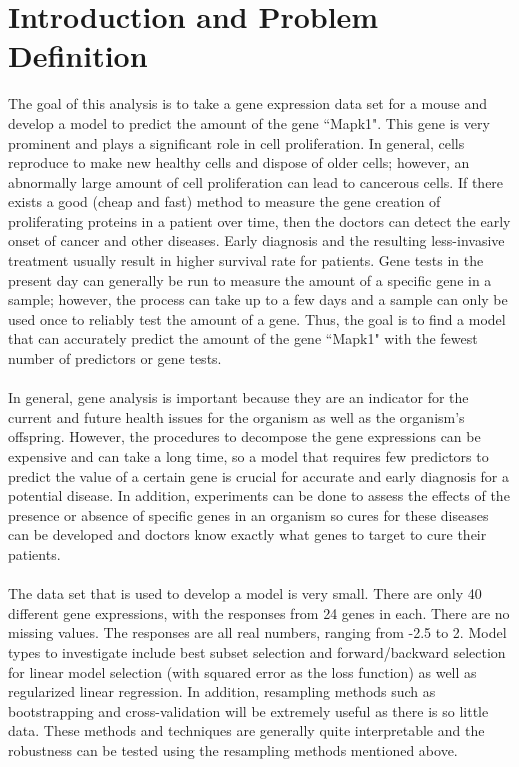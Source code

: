 \documentclass{article}
\begin{document}
\section{Introduction and Problem Definition}
The goal of this analysis is to take a gene expression data set for a mouse and develop a model to predict the amount of the gene ``Mapk1".  This gene is very prominent and plays a significant role in cell proliferation.  In general, cells reproduce to make new healthy cells and dispose of older cells; however, an abnormally large amount of cell proliferation can lead to cancerous cells.  If there exists a good (cheap and fast) method to measure the gene creation of proliferating proteins in a patient over time, then the doctors can detect the early onset of cancer and other diseases.  Early diagnosis and the resulting less-invasive treatment usually result in higher survival rate for patients.  Gene tests in the present day can generally be run to measure the amount of a specific gene in a sample; however, the process can take up to a few days and a sample can only be used once to reliably test the amount of a gene.  Thus, the goal is to find a model that can accurately predict the amount of the gene  ``Mapk1" with the fewest number of predictors or gene tests.\\
\null\\
%
In general, gene analysis is important because they are an indicator for the current and future health issues for the organism as well as the organism's offspring.  However, the procedures to decompose the gene expressions can be expensive and can take a long time, so a model that requires few predictors to predict the value of a certain gene is crucial for accurate and early diagnosis for a potential disease.  In addition, experiments can be done to assess the effects of the presence or absence of specific genes in an organism so cures for these diseases can be developed and doctors know exactly what genes to target to cure their patients.\\
\null\\
The data set that is used to develop a model is very small.  There are only 40 different gene expressions, with the responses from 24 genes in each.  There are no missing values.  The responses are all real numbers, ranging from -2.5 to 2.  Model types to investigate include best subset selection and forward/backward selection for linear model selection (with squared error as the loss function) as well as regularized linear regression.  In addition, resampling methods such as bootstrapping and cross-validation will be extremely useful as there is so little data.  These methods and techniques are generally quite interpretable and the robustness can be tested using the resampling methods mentioned above.\\
\end{document}
